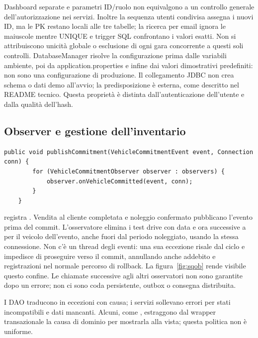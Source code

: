 Dashboard separate e parametri ID/ruolo non equivalgono a un controllo
generale dell'autorizzazione nei servizi. Inoltre la sequenza utenti
condivisa assegna i nuovi ID, ma le PK restano locali alle tre tabelle;
la ricerca per email ignora le maiuscole mentre UNIQUE e trigger SQL
confrontano i valori esatti. Non si attribuiscono unicità globale o
esclusione di ogni gara concorrente a questi soli controlli.
DatabaseManager risolve la configurazione prima dalle variabili ambiente,
poi da application.properties e infine dai valori dimostrativi predefiniti:
non sono una configurazione di produzione. Il collegamento JDBC non crea
schema o dati demo all'avvio; la predisposizione è esterna, come descritto
nel README tecnico. Questa proprietà è distinta dall'autenticazione
dell'utente e dalla qualità dell'hash.


\subsection{Observer e gestione dell'inventario}\label{sec:impl-observer}
\noindent\begin{minipage}{\linewidth}
\begin{lstlisting}[firstnumber=28,caption={\code{VehicleEventPublisher.java}: gli osservatori ricevono la connessione del chiamante.},
  label=lst:observer]
    public void publishCommitment(VehicleCommitmentEvent event, Connection conn) {
        for (VehicleCommitmentObserver observer : observers) {
            observer.onVehicleCommitted(event, conn);
        }
    }
\end{lstlisting}
\end{minipage}


 registra .
Vendita al cliente completata e noleggio confermato pubblicano l'evento
prima del commit. L'osservatore elimina i test drive con data e ora
successive a  per il veicolo dell'evento, anche
fuori dal periodo noleggiato, usando la
stessa connessione. Non c'è un thread degli eventi: una sua eccezione
risale dal ciclo e impedisce di proseguire verso il commit, annullando
anche addebito e registrazioni nel normale percorso di rollback.
La figura~\ref{fig:sqob} rende visibile questo confine.
Le chiamate successive agli altri osservatori non sono garantite dopo
un errore; non ci sono coda persistente, outbox o consegna distribuita.

I DAO traducono  in eccezioni con causa; i servizi
sollevano errori per stati incompatibili e dati mancanti. Alcuni, come
, estraggono dal wrapper transazionale la causa di
dominio per mostrarla alla vista; questa politica non è uniforme.


